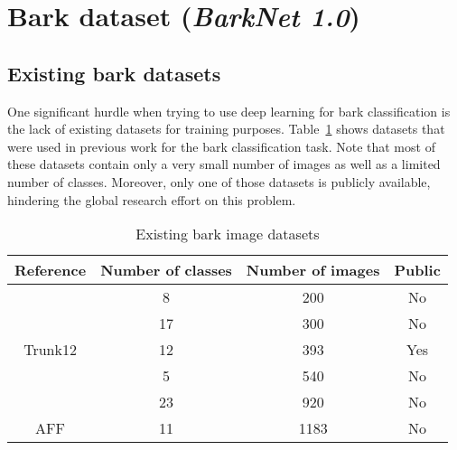 \documentclass[letterpaper, 10 pt, conference]{ieeeconf}  %
\begin{document}
\section{Bark dataset (\emph{BarkNet 1.0})} \label{sec:dataset}

\subsection{Existing bark datasets}
One significant hurdle when trying to use deep learning for bark classification is the lack of existing datasets for training purposes. Table~\ref{table:existing_datasets} shows datasets that were used in previous work for the bark classification task. Note that most of these datasets contain only a very small number of images as well as a limited number of classes. Moreover, only one of those datasets is publicly available, hindering the global research effort on this problem.

\begin{table}[t]
\vspace*{3mm}
\renewcommand{\arraystretch}{1.3}
\centering
\begin{tabular}{| c | c | c | c |}
\hline
Reference & Number of classes & Number of images & Public\\
\hline
\cite{1281045} & 8 & 200 & No\\
\hline
\cite{HuangZhi-Kai;Huang2006} & 17 & 300 & No\\
\hline
Trunk12\cite{trunk12} & 12 & 393 & Yes\\
\hline
\cite{Bressane2015} & 5 & 540 & No \\
\hline
\cite{7880233} & 23 & 920 & No\\
\hline
AFF\cite{Fiel} & 11 & 1183 & No \\
\hline
\end{tabular}
\vspace{0.03in}
\caption{Existing bark image datasets}
\label{table:existing_datasets}
\end{table}
\end{document}
